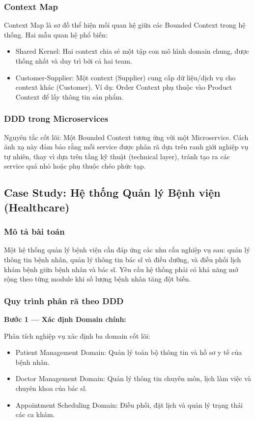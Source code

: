 \documentclass[12pt,a4paper]{article}
\begin{document}
\subsubsection{Context Map}
Context Map là sơ đồ thể hiện mối quan hệ giữa các Bounded Context trong hệ thống. Hai mẫu quan hệ phổ biến:
\begin{itemize}
  \item Shared Kernel: Hai context chia sẻ một tập con mô hình domain chung, được thống nhất và duy trì bởi cả hai team.
  \item Customer-Supplier: Một context (Supplier) cung cấp dữ liệu/dịch vụ cho context khác (Customer). Ví dụ: Order Context phụ thuộc vào Product Context để lấy thông tin sản phẩm.
\end{itemize}

\subsubsection{DDD trong Microservices}
Nguyên tắc cốt lõi: Một Bounded Context tương ứng với một Microservice. Cách ánh xạ này
đảm bảo rằng mỗi service được phân rã dựa trên ranh giới nghiệp vụ tự nhiên, thay vì dựa trên
tầng kỹ thuật (technical layer), tránh tạo ra các service quá nhỏ hoặc phụ thuộc chéo phức tạp.

\subsection{Case Study: Hệ thống Quản lý Bệnh viện (Healthcare)}
\subsubsection{Mô tả bài toán}
Một hệ thống quản lý bệnh viện cần đáp ứng các nhu cầu nghiệp vụ sau: quản lý thông tin bệnh
nhân, quản lý thông tin bác sĩ và điều dưỡng, và điều phối lịch khám bệnh giữa bệnh nhân và bác
sĩ. Yêu cầu hệ thống phải có khả năng mở rộng theo từng module khi số lượng bệnh nhân tăng
đột biến.

\subsubsection{Quy trình phân rã theo DDD}
\textbf{Bước 1 --- Xác định Domain chính:}

Phân tích nghiệp vụ xác định ba domain cốt lõi:
\begin{itemize}
  \item Patient Management Domain: Quản lý toàn bộ thông tin và hồ sơ y tế của bệnh nhân.
  \item Doctor Management Domain: Quản lý thông tin chuyên môn, lịch làm việc và chuyên khoa của bác sĩ.
  \item Appointment Scheduling Domain: Điều phối, đặt lịch và quản lý trạng thái các ca khám.
\end{itemize}
\end{document}
